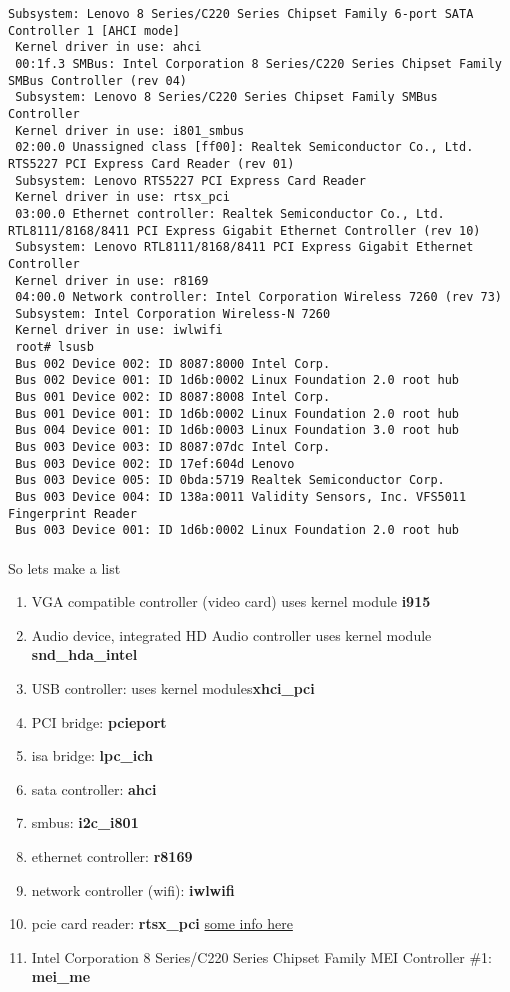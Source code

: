 \documentclass[10pt,a4paper]{article}
\begin{document}
\begin{lstlisting}[style=BashInputRoot]
 Subsystem: Lenovo 8 Series/C220 Series Chipset Family 6-port SATA Controller 1 [AHCI mode]
 Kernel driver in use: ahci
 00:1f.3 SMBus: Intel Corporation 8 Series/C220 Series Chipset Family SMBus Controller (rev 04)
 Subsystem: Lenovo 8 Series/C220 Series Chipset Family SMBus Controller
 Kernel driver in use: i801_smbus
 02:00.0 Unassigned class [ff00]: Realtek Semiconductor Co., Ltd. RTS5227 PCI Express Card Reader (rev 01)
 Subsystem: Lenovo RTS5227 PCI Express Card Reader
 Kernel driver in use: rtsx_pci
 03:00.0 Ethernet controller: Realtek Semiconductor Co., Ltd. RTL8111/8168/8411 PCI Express Gigabit Ethernet Controller (rev 10)
 Subsystem: Lenovo RTL8111/8168/8411 PCI Express Gigabit Ethernet Controller
 Kernel driver in use: r8169
 04:00.0 Network controller: Intel Corporation Wireless 7260 (rev 73)
 Subsystem: Intel Corporation Wireless-N 7260
 Kernel driver in use: iwlwifi
 root# lsusb
 Bus 002 Device 002: ID 8087:8000 Intel Corp.
 Bus 002 Device 001: ID 1d6b:0002 Linux Foundation 2.0 root hub
 Bus 001 Device 002: ID 8087:8008 Intel Corp.
 Bus 001 Device 001: ID 1d6b:0002 Linux Foundation 2.0 root hub
 Bus 004 Device 001: ID 1d6b:0003 Linux Foundation 3.0 root hub
 Bus 003 Device 003: ID 8087:07dc Intel Corp.
 Bus 003 Device 002: ID 17ef:604d Lenovo
 Bus 003 Device 005: ID 0bda:5719 Realtek Semiconductor Corp.
 Bus 003 Device 004: ID 138a:0011 Validity Sensors, Inc. VFS5011 Fingerprint Reader
 Bus 003 Device 001: ID 1d6b:0002 Linux Foundation 2.0 root hub
                \end{lstlisting}

                \paragraph{} So lets make a list
                \begin{enumerate}
                    \item VGA compatible controller (video card) uses kernel module \textbf{i915}
                    \item Audio device, integrated HD Audio controller uses kernel module \textbf{snd\_hda\_intel}
                    \item USB controller: uses kernel modules\textbf{xhci\_pci}
                    \item PCI bridge: \textbf{pcieport}
                    \item isa bridge: \textbf{lpc\_ich}
                    \item sata controller: \textbf{ahci}
                    \item smbus: \textbf{i2c\_i801}
                    \item ethernet controller: \textbf{r8169}
                    \item network controller (wifi): \textbf{iwlwifi}
                    \item pcie card reader: \textbf{rtsx\_pci} \href{https://wiki.gentoo.org/wiki/Lenovo_ThinkPad_T440s#Hardware_Status}{some info here}
                    \item Intel Corporation 8 Series/C220 Series Chipset Family MEI Controller \#1: \textbf{mei\_me}
                \end{enumerate}
\end{document}
